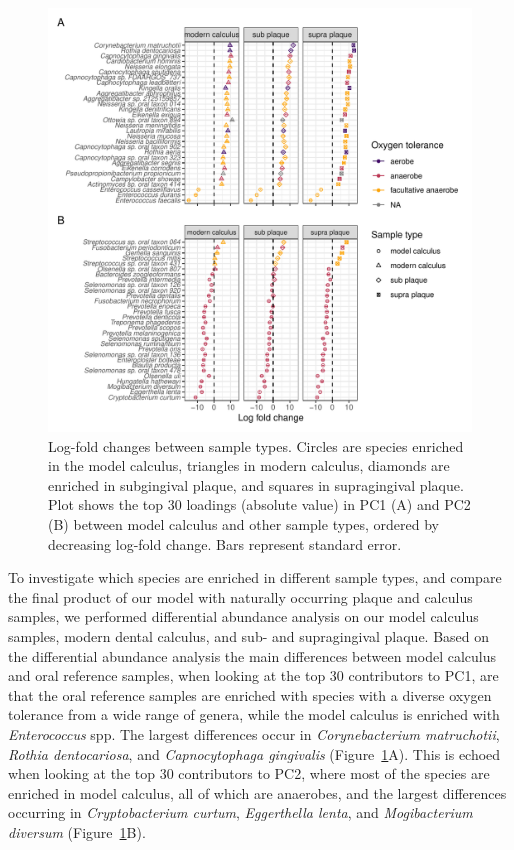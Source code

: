 \documentclass[
]{article}
\begin{document}
\begin{figure}

{\centering \includegraphics{index_files/figure-pdf/fig-diffabund-comp-1.pdf}

}

\caption{\label{fig-diffabund-comp}Log-fold changes between sample
types. Circles are species enriched in the model calculus, triangles in
modern calculus, diamonds are enriched in subgingival plaque, and
squares in supragingival plaque. Plot shows the top 30 loadings
(absolute value) in PC1 (A) and PC2 (B) between model calculus and other
sample types, ordered by decreasing log-fold change. Bars represent
standard error.}

\end{figure}

To investigate which species are enriched in different sample types, and
compare the final product of our model with naturally occurring plaque
and calculus samples, we performed differential abundance analysis on
our model calculus samples, modern dental calculus, and sub- and
supragingival plaque. Based on the differential abundance analysis the
main differences between model calculus and oral reference samples, when
looking at the top 30 contributors to PC1, are that the oral reference
samples are enriched with species with a diverse oxygen tolerance from a
wide range of genera, while the model calculus is enriched with
\emph{Enterococcus} spp. The largest differences occur in
\emph{Corynebacterium matruchotii}, \emph{Rothia dentocariosa}, and
\emph{Capnocytophaga gingivalis} (Figure~\ref{fig-diffabund-comp}A).
This is echoed when looking at the top 30 contributors to PC2, where
most of the species are enriched in model calculus, all of which are
anaerobes, and the largest differences occurring in
\emph{Cryptobacterium curtum}, \emph{Eggerthella lenta}, and
\emph{Mogibacterium diversum} (Figure~\ref{fig-diffabund-comp}B).
\end{document}

